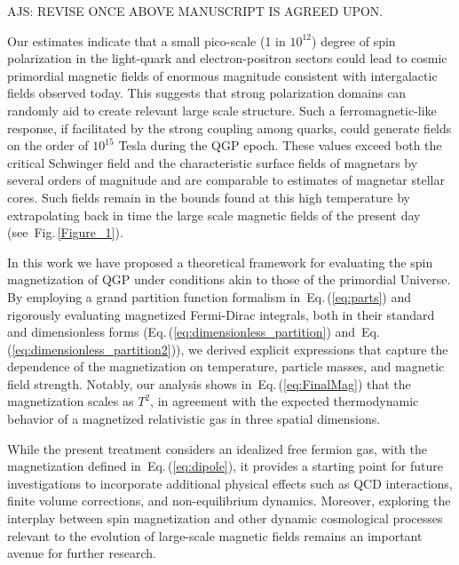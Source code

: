 \documentclass[epjST]{svjour}
\newcommand{\req}[1]{Eq.\,(\ref{#1})}
\newcommand{\rf}[1]{Fig.\,{\ref{#1}}}
\begin{document}
{\color{blue}AJS: REVISE ONCE ABOVE MANUSCRIPT IS AGREED UPON.}

Our estimates indicate that {\color{blue}a small pico-scale (1 in $10^{12}$)} degree of spin polarization in the light-quark and electron-positron sectors could lead to cosmic primordial magnetic fields of enormous magnitude consistent with intergalactic fields observed today. This suggests that strong polarization domains can randomly aid to create relevant large scale structure. Such a ferromagnetic-like response, if facilitated by the strong coupling among quarks, could generate fields on the order of \(10^{15}\) Tesla during the QGP epoch. These values exceed both the critical Schwinger field and the characteristic surface fields of magnetars by several orders of magnitude and are comparable to estimates of magnetar stellar cores. Such fields remain in the bounds found at this high temperature by extrapolating back in time the large scale magnetic fields of the present day (see~\rf{Figure_1}).

In this work we have proposed a theoretical framework for evaluating the spin magnetization of QGP under conditions akin to those of the primordial Universe. By employing a grand partition function formalism in~\req{eq:parts} and rigorously evaluating magnetized Fermi-Dirac integrals, both in their standard and dimensionless forms (\req{eq:dimensionless_partition} and~\req{eq:dimensionless_partition2}), we derived explicit expressions that capture the dependence of the magnetization on temperature, particle masses, and magnetic field strength. Notably, our analysis shows in~\req{eq:FinalMag} that the magnetization scales as \(T^2\), in agreement with the expected thermodynamic behavior of a magnetized relativistic gas in three spatial dimensions.

While the present treatment considers an idealized free fermion gas, with the magnetization defined in~\req{eq:dipole}, it provides a starting point for future investigations to incorporate additional physical effects such as QCD interactions, finite volume corrections, and non-equilibrium dynamics. Moreover, exploring the interplay between spin magnetization and other dynamic cosmological processes relevant to the evolution of large-scale magnetic fields remains an important avenue for further research.\\
\end{document}
